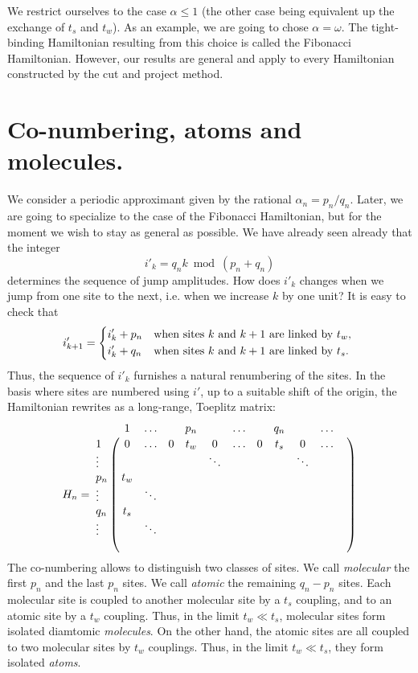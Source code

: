 \documentclass[11pt]{article}
\begin{document}
We restrict ourselves to the case $\alpha \leq 1$ (the other case being equivalent up the exchange of $t_s$ and $t_w$). As an example, we are going to chose $\alpha = \omega$. The tight-binding Hamiltonian resulting from this choice is called the Fibonacci Hamiltonian.
However, our results are general and apply to every Hamiltonian constructed by the cut and project method.

\section{Co-numbering, atoms and molecules.}

We consider a periodic approximant given by the rational $\alpha_n = p_n/q_n$. Later, we are going to specialize to the case of the Fibonacci Hamiltonian, but for the moment we wish to stay as general as possible.
We have already seen already that the integer
\begin{equation}
	i'_k = q_n k \bmod(p_n+q_n)
\end{equation}
determines the sequence of jump amplitudes. How does $i'_k$ changes when we jump from one site to the next, i.e. when we increase $k$ by one unit? It is easy to check that
\begin{equation}
	i'_{k+1} = \begin{dcases*}
	i'_k + p_n & when sites $k$ and $k+1$ are linked by $t_w$, \\
	i'_k + q_n & when sites $k$ and $k+1$ are linked by $t_s$.
	\end{dcases*}
\end{equation}
Thus, the sequence of $i'_k$ furnishes a natural renumbering of the sites.
In the basis where sites are numbered using $i'$, up to a suitable shift of the origin, the Hamiltonian rewrites as a long-range, Toeplitz matrix:
\begin{equation}
	H_n = 
	\bordermatrix{ 
	 	& 1 	&	\ldots & & p_n	& &  \ldots &	& q_n &	& \ldots	&  \cr
    1 	& 0 		& \ldots & 0 & t_w & 0	& \ldots & 0 & t_s	& 0 		& \ldots		 \cr
    \vdots & & & & & \ddots	& & & & \ddots & \cr
    p_n & t_w \cr
    \vdots & & \ddots \cr
    q_n & t_s \cr
    \vdots & & \ddots \cr
     & 
    }
\end{equation}
The co-numbering allows to distinguish two classes of sites. We call \emph{molecular} the first $p_n$ and the last $p_n$ sites. We call \emph{atomic} the remaining $q_n - p_n$ sites.
Each molecular site is coupled to another molecular site by a $t_s$ coupling, and to an atomic site by a $t_w$ coupling. Thus, in the limit $t_w \ll t_s$, molecular sites form isolated diamtomic \emph{molecules}. 
On the other hand, the atomic sites are all coupled to two molecular sites by $t_w$ couplings. Thus, in the limit $t_w \ll t_s$, they form isolated \emph{atoms}.
\end{document}
